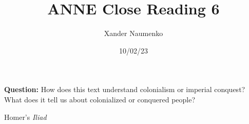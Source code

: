 \documentclass[letterpaper, reqno,11pt]{article}
\begin{document}
\title{ANNE Close Reading 6}
\date{10/02/23}
\author{Xander Naumenko}
\maketitle

{\bf Question:} How does this text understand colonialism or imperial conquest? What does it tell us about colonialized or conquered people? 

Homer's {\em Iliad} 
\end{document}
